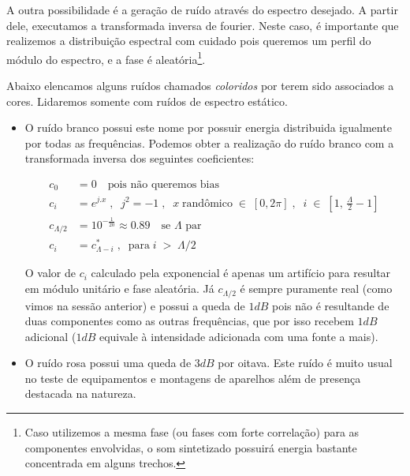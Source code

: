 A outra possibilidade é a geração de ruído através do espectro desejado. A partir
dele, executamos a transformada inversa de fourier. Neste caso, é importante
que realizemos a distribuição espectral com cuidado pois queremos um perfil
do módulo do espectro, e a fase é aleatória\footnote{Caso utilizemos a mesma fase
(ou fases com forte correlação) para
as componentes envolvidas, o som sintetizado possuirá energia bastante concentrada
em alguns trechos.}.

Abaixo elencamos alguns ruídos chamados \emph{coloridos} por terem
sido associados a cores. Lidaremos somente com ruídos de espectro estático.

\begin{itemize}

\item O ruído branco possui este nome por possuir energia distribuida
igualmente por todas as frequências. Podemos obter a realização
do ruído branco com a transformada inversa dos seguintes coeficientes:


\begin{equation}\label{eq:branco}
\begin{split}
c_0 & =0 \quad \text{pois não queremos bias} \\
c_i & =e^{j.x}\;,\;\; j^2=-1 \;, \;\; x \; \text{randômico} \; \in \; [0,2\pi]\;,\;\; i \; \in \; [1, \, \frac{\Lambda}{2}-1] \\
c_{\Lambda/2} & = 10^{-\frac{1}{20}} \approx 0.89 \quad \text{se $\Lambda$ par}\\ 
c_i & = c_{\Lambda - i}^*\;,\;\; \text{para}\;  i \; > \;  \Lambda/2
\end{split}
\end{equation}

O valor de $c_i$ calculado pela exponencial é apenas um artifício para resultar em módulo unitário e fase aleatória. Já $c_{\Lambda/2}$ é sempre puramente real (como vimos na sessão anterior) e possui a queda de $1dB$ pois não é resultande de duas componentes como as outras frequências, que por isso recebem $1dB$ adicional ($1dB$ equivale à intensidade adicionada com uma fonte a mais).

\item O ruído rosa possui uma queda de $3dB$ por oitava. Este ruído é muito usual no teste de equipamentos e montagens de aparelhos além de presença destacada na natureza. 


\end{itemize}
